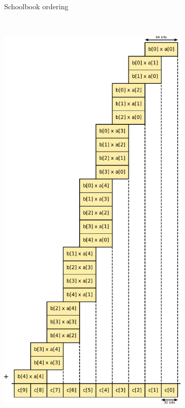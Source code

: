 \documentclass[12pt, a4paper]{report}
\begin{document}
\begin{sloppypar}
\begin{figure}
\begin{subfigure}[h]{0.5\textwidth}
                \caption{Schoolbook ordering}
                \label{fig:schoolbook_multiplication_ordering}
        \end{subfigure}%
        ~ %
        \begin{subfigure}[h]{0.5\textwidth}
                \centering
                \includegraphics[width=\textwidth]{figs/multiplication_order_for_carry_propagation}

\end{subfigure}
\end{figure}
\end{sloppypar}
\end{document}
